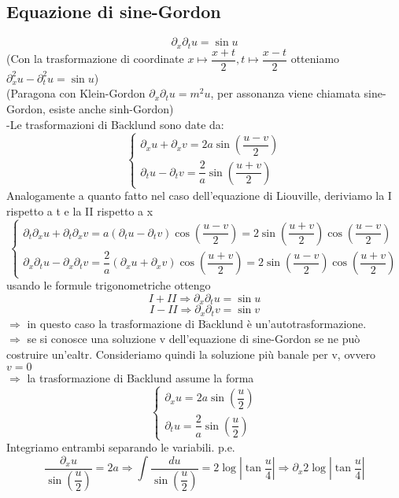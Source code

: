 \documentclass[a4paper,11pt]{report}
\newcommand{\Backlund}{B$\ddot{\text{a}}$cklund }
\begin{document}
\subsection{Equazione di sine-Gordon}
$$
\partial_x\partial_t u = \sin u
$$
(Con la trasformazione di coordinate $x \mapsto \dfrac{x+t}{2}, t\mapsto\dfrac{x-t}{2}$ otteniamo $\partial_x^2 u - \partial_t^2 u = \sin u$)\\
(Paragona con Klein-Gordon $\partial_x\partial_t u = m^2 u$, per assonanza viene chiamata sine-Gordon, esiste anche sinh-Gordon)\\
-Le trasformazioni di \Backlund sono date da:
$$
\left\{
\begin{matrix}
\partial_x u + \partial_x v = 2a \sin\left(\dfrac{u-v}{2}\right) \\
\partial_t u - \partial_t v = \dfrac{2}{a} \sin\left(\dfrac{u+v}{2}\right)
\end{matrix}
\right.
$$
Analogamente a quanto fatto nel caso dell'equazione di Liouville, deriviamo la I rispetto a t e la II rispetto a x
$$
\left\{
\begin{matrix}
\partial_t\partial_x u + \partial_t\partial_x v = a (\partial_t u - \partial_t v)\cos\left(\dfrac{u-v}{2}\right)=2\sin \left(\dfrac{u+v}{2}\right) \cos \left(\dfrac{u-v}{2}\right) \\
\partial_x\partial_t u - \partial_x\partial_t v = \dfrac{2}{a}(\partial_x u + \partial_x v)\cos\left(\dfrac{u+v}{2}\right)=2\sin\left(\dfrac{u-v}{2}\right)\cos\left(\dfrac{u+v}{2}\right)
\end{matrix}
\right.
$$
usando le formule trigonometriche ottengo
$$
I + II \Rightarrow \partial_x\partial_t u = \sin u
$$
$$
I-II \Rightarrow \partial_x\partial_t v=\sin v
$$
$\Rightarrow$ in questo caso la trasformazione di \Backlund è un'autotrasformazione.\\
$\Rightarrow$ se si conosce una soluzione v dell'equazione di sine-Gordon se ne può costruire un'ealtr. Consideriamo quindi la soluzione più banale per v, ovvero $v=0$\\
$\Rightarrow$ la trasformazione di \Backlund assume la forma
$$
\left\{
\begin{matrix}
\partial_x u = 2a\sin\left(\dfrac{u}{2}\right) \\
\partial_t u = \dfrac{2}{a}\sin\left(\dfrac{u}{2}\right)
\end{matrix}
\right.
$$
Integriamo entrambi separando le variabili. p.e.
$$
\dfrac{\partial_x u }{\sin\left(\dfrac{u}{2}\right)}=2a \Rightarrow \int\dfrac{du}{\sin\left(\dfrac{u}{2}\right)}=2\log\left|\tan\dfrac{u}{4}\right| \Rightarrow \partial_x 2\log \left| \tan \dfrac{u}{4}\right|
$$
\end{document}
